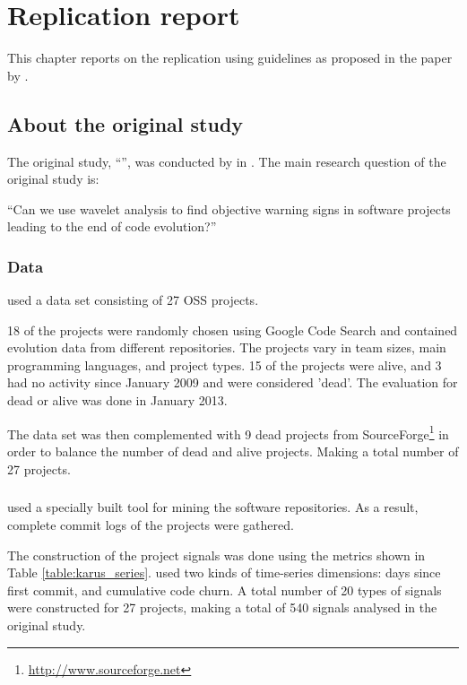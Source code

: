 \chapter{Replication report}
\label{replication}

This chapter reports on the replication using guidelines as proposed in the
paper by \citet{carver}.

\section{About the original study}
The original study, ``\repltitle{}'', was conducted by \replauthor{} in
\citeyear{karus2013}. The main research question of the original study is:

``Can we use wavelet analysis to find objective warning signs in software
projects leading to the end of code evolution?''

\subsection{Data}
\citeauthor{karus2013} used a data set consisting of 27 OSS projects.

18 of the projects were randomly chosen using Google Code Search and contained
evolution data from different repositories. The projects vary in team sizes,
main programming languages, and project types. 15 of the projects were alive,
and 3 had no activity since January 2009 and were considered 'dead'. The
evaluation for dead or alive was done in January 2013.

The data set was then complemented with 9 dead projects from
SourceForge\footnote{\url{http://www.sourceforge.net}} in order to balance the
number of dead and alive projects. Making a total number of 27 projects.

\paragraph{}
\citeauthor{karus2013} used a specially built tool for mining the software
repositories. As a result, complete commit logs of the projects were gathered.

The construction of the project signals was done using the metrics shown in
Table \ref{table:karus_series}. \citeauthor{karus2013} used two kinds of
time-series dimensions: days since first commit, and cumulative code churn. A
total number of 20 types of signals were constructed for 27 projects, making a
total of 540 signals analysed in the original study.

